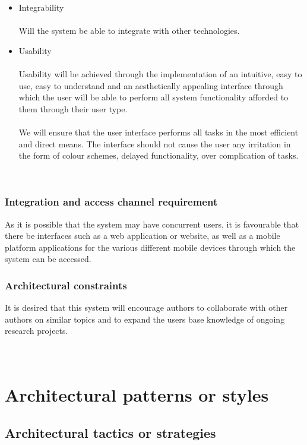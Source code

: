 \documentclass[a4paper]{article}
\begin{document}
\begin{itemize}
\begin{itemize}
		    
		\item Integrability \\\\
		    Will the system be able to integrate with other technologies.
		\item Usability \\\\
		    Usability will be achieved through the implementation of an intuitive, easy to use, easy to understand and an aesthetically appealing interface through which the user will be able to perform all system functionality afforded to them through their user type.
		    \\\\
		    We will ensure that the user interface performs all tasks in the most efficient and direct means. The interface should not cause the user any irritation in the form of colour schemes, delayed functionality, over complication of tasks.
	\end{itemize}
	\\

	\subsubsection{Integration and access channel requirement}
		As it is possible that the system may have concurrent users, it is favourable that there be interfaces such as a web application or website, as well as a mobile platform applications for the various different mobile devices through which the system can be accessed.
		\\
	\subsubsection{Architectural constraints}
	It is desired that this system will encourage authors to collaborate with other authors on similar topics and to expand the users base knowledge of ongoing research projects.
	\\
	\\
	\\
	
	
	\section{Architectural patterns or styles}

	\subsection{Architectural tactics or strategies}


\end{itemize}
\end{document}
